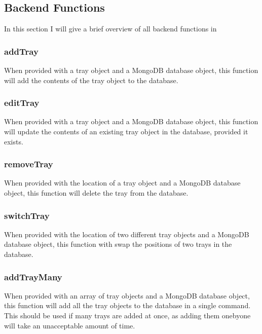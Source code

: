 \documentclass[letterpaper,10pt,english]{sphinxmanual}
\let\oldsubsection\subsection
\renewcommand{\subsection}{\needspace{6\baselineskip}\oldsubsection}
\begin{document}
\subsection{Back\sphinxhyphen{}end Functions}
\label{\detokenize{docs/System_Overview/Backend_overview:back-end-functions}}
In this section I will give a brief overview of all back\sphinxhyphen{}end functions
in 


\subsubsection{addTray}
\label{\detokenize{docs/System_Overview/Backend_overview:addtray}}
When provided with a tray object and a MongoDB database object, this
function will add the contents of the tray object to the database.


\subsubsection{editTray}
\label{\detokenize{docs/System_Overview/Backend_overview:edittray}}
When provided with a tray object and a MongoDB database object, this
function will update the contents of an existing tray object in the
database, provided it exists.


\subsubsection{removeTray}
\label{\detokenize{docs/System_Overview/Backend_overview:removetray}}
When provided with the location of a tray object and a MongoDB database
object, this function will delete the tray from the database.


\subsubsection{switchTray}
\label{\detokenize{docs/System_Overview/Backend_overview:switchtray}}
When provided with the location of two different tray objects and a
MongoDB database object, this function with swap the positions of two
trays in the database.


\subsubsection{addTrayMany}
\label{\detokenize{docs/System_Overview/Backend_overview:addtraymany}}
When provided with an array of tray objects and a MongoDB database
object, this function will add all the tray objects to the database in a
single command. This should be used if many trays are added at once, as
adding them one\sphinxhyphen{}by\sphinxhyphen{}one will take an unacceptable amount of time.
\end{document}
